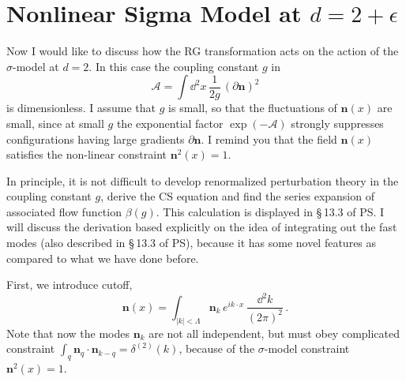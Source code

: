 \section{Nonlinear Sigma Model at \texorpdfstring{$d=2+\epsilon$}{d=2+epsilon}}

Now I would like to discuss how the RG transformation acts on the action of the
$\sigma$-model at $d=2$. In this case the coupling constant $g$ in
\[
\mathcal A=\int \dd^2x\,\frac1{2g}\,(\partial\mathbf n)^2
\]
is dimensionless. I assume that $g$ is small, so that the fluctuations of
$\mathbf n(x)$ are small, since at small $g$ the exponential factor
$\exp(-\mathcal A)$ strongly suppresses configurations having large gradients
$\partial\mathbf n$. I remind you that the field $\mathbf n(x)$ satisfies the
non-linear constraint $\mathbf n^2(x)=1$.

In principle, it is not difficult to develop renormalized perturbation theory in
the coupling constant $g$, derive the CS equation and find the series expansion of
associated flow function $\beta(g)$. This calculation is displayed in \S\,13.3 of
PS. I will discuss the derivation based explicitly on the idea of integrating out
the fast modes (also described in \S\,13.3 of PS), because it has some novel
features as compared to what we have done before.

First, we introduce cutoff,
\[
\mathbf n(x)=\int_{|k|<\Lambda}\mathbf n_k\,e^{ik\cdot x}\,\frac{\dd^2k}{(2\pi)^2}\,.
\]
Note that now the modes $\mathbf n_k$ are not all independent, but must obey
complicated constraint $\int_q\mathbf n_q\cdot\mathbf n_{k-q}=\delta^{(2)}(k)$, because
of the $\sigma$-model constraint $\mathbf n^2(x)=1$.

